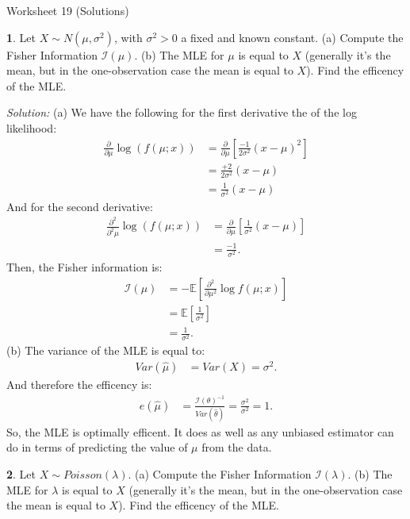 \documentclass{tufte-handout}
\begin{document}
\justify

{\LARGE Worksheet 19 (Solutions)}

\vspace*{18pt}


\textbf{1}. Let $X \sim N(\mu, \sigma^2)$, with $\sigma^2 > 0$ a fixed and known constant.
(a) Compute the Fisher Information $\mathcal{I}(\mu)$. (b) The MLE for $\mu$
is equal to $X$ (generally it's the mean, but in the one-observation case the
mean is equal to $X$). Find the efficency of the MLE.

\textit{Solution:} (a) We have the following for the first derivative the of the log likelihood:
\begin{align*}
\frac{\partial}{\partial \mu} \log(f(\mu; x))
&= \frac{\partial}{\partial \mu} \left[ \frac{-1}{2\sigma^2} (x - \mu)^2 \right] \\
&= \frac{+2}{2\sigma^2} (x - \mu) \\
&= \frac{1}{\sigma^2} (x - \mu)
\end{align*}
And for the second derivative:
\begin{align*}
\frac{\partial^2}{\partial^2 \mu} \log(f(\mu; x))
&= \frac{\partial}{\partial \mu} \left[ \frac{1}{\sigma^2} (x - \mu) \right] \\
&= \frac{-1}{\sigma^2}.
\end{align*}
Then, the Fisher information is:
\begin{align*}
\mathcal{I}(\mu) &= - \mathbb{E} \left[ \frac{\partial^2}{\partial \mu^2} \log f(\mu; x) \right] \\
&= \mathbb{E} \left[ \frac{1}{\sigma^2} \right] \\
&= \frac{1}{\sigma^2}.
\end{align*}
(b) The variance of the MLE is equal to:
\begin{align*}
Var(\hat{\mu}) &= Var(X) = \sigma^2.
\end{align*}
And therefore the efficency is:
\begin{align*}
e(\hat{\mu}) &= \frac{\mathcal{I}(\theta)^{-1}}{Var(\widehat{\theta})} = \frac{\sigma^2}{\sigma^2} = 1.
\end{align*}
So, the MLE is optimally efficent. It does as well as any unbiased estimator can do in
terms of predicting the value of $\mu$ from the data.

\textbf{2}. Let $X \sim Poisson(\lambda)$. (a) Compute the Fisher Information $\mathcal{I}(\lambda)$.
(b) The MLE for $\lambda$ is equal to $X$ (generally it's the mean, but in the one-observation
case the mean is equal to $X$). Find the efficency of the MLE.
\end{document}
